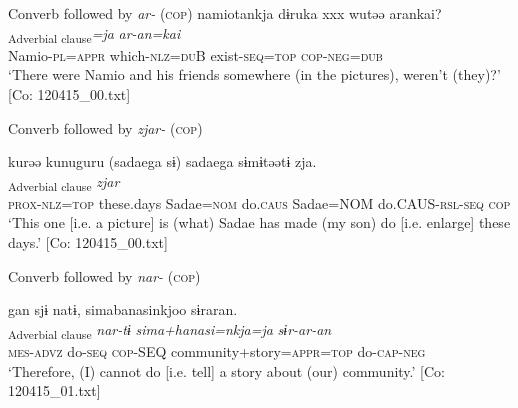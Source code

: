\exi{} Converb followed by \textit{ar-} (\textsc{cop})
\ex %
    \glll  namiotankja  dɨruka  xxx  wutəə    arankai?\\
      [\textit{namio-taa=nkja}  \textit{dɨ-ru=ka}    \textit{wur-tɨ}]\textsubscript{Adverbial clause}\textit{=ja}    \textit{ar-an=kai}\\
      Namio-\textsc{pl}=\textsc{appr}  which-\textsc{nlz}=\textsc{du}B    exist-\textsc{seq}=\textsc{top}   \textsc{cop}-\textsc{neg}=\textsc{dub}\\
      \glt       ‘There were Namio and his friends somewhere (in the pictures), weren’t (they)?’ [Co: 120415\_00.txt]

\exi{} Converb followed by \textit{zjar-} (\textsc{cop})

\ex \relax [= (8-123 a)]%
    \glll  kurəə  kunuguru  (sadaega  sɨ)   sadaega  sɨmɨtəətɨ  zja.\\
      [\textit{ku-rɨ=ja}  \textit{kunuguru}  \textit{sadae=ga}  \textit{sɨmɨr}   \textit{sadae=ga}  \textit{sɨmɨr-təər-tɨ}]\textsubscript{Adverbial clause}  \textit{zjar}\\
      \textsc{prox}-\textsc{nlz}=\textsc{top}  these.days  Sadae=\textsc{nom}  do.\textsc{caus}   Sadae=NOM  do.CAUS-\textsc{rsl}-\textsc{seq}  \textsc{cop}\\
      \glt ‘This one [i.e. a picture] is (what) Sadae has made (my son) do [i.e. enlarge] these days.’   [Co: 120415\_00.txt]

\exi{}  Converb followed by \textit{nar-} (\textsc{cop})

\ex %
     \glll  gan  sjɨ  natɨ,  simabanasinkjoo  sɨraran.\\
      [\textit{ga-n}  \textit{sɨr-tɨ}]\textsubscript{Adverbial clause}  \textit{nar-tɨ}  \textit{sima+hanasi=nkja=ja}  \textit{sɨr-ar-an}\\
      \textsc{mes}-\textsc{advz}  do-\textsc{seq}  \textsc{cop}-SEQ  community+story=\textsc{appr}=\textsc{top}   do-\textsc{cap}-\textsc{neg}\\
      \glt       ‘Therefore, (I) cannot do [i.e. tell] a story about (our) community.’ [Co: 120415\_01.txt]
    \z
\z

